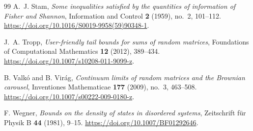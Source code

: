 \begin{thebibliography}{99}
A.~J. Stam,
\emph{Some inequalities satisfied by the quantities of information of Fisher and Shannon},
Information and Control \textbf{2} (1959), no.~2, 101--112.
\url{https://doi.org/10.1016/S0019-9958(59)90348-1}.

J.~A. Tropp,
\emph{User-friendly tail bounds for sums of random matrices},
Foundations of Computational Mathematics \textbf{12} (2012), 389--434.
\url{https://doi.org/10.1007/s10208-011-9099-z}.

B. Valk\'o and B. Vir\'ag,
\emph{Continuum limits of random matrices and the Brownian carousel},
Inventiones Mathematicae \textbf{177} (2009), no.~3, 463--508.
\url{https://doi.org/10.1007/s00222-009-0180-z}.

F. Wegner,
\emph{Bounds on the density of states in disordered systems},
Zeitschrift f\"ur Physik B \textbf{44} (1981), 9--15.
\url{https://doi.org/10.1007/BF01292646}.

\end{thebibliography}
